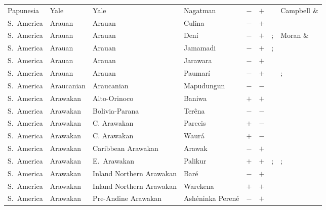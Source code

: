 \begin{landscape}
\begin{longtable}{l>{\raggedright\arraybackslash}p{2.2cm}>{\raggedright}p{2.5cm}>{\raggedright\arraybackslash}p{2.5cm}cc>{\raggedright\arraybackslash}p{3.4cm}>{\raggedright\arraybackslash}p{3.4cm}}
Papunesia & Yale & Yale & Nagatman & $-$ & $+$ & \citealt[14]{Campbell1987} & Campbell \& \citealt[18--22, 44--49]{Campbell1987}\\
S.~America & Arauan & Arauan & Culina & $-$ & $+$ & \citealt{Gil2013} & \citealt[249--251]{Derbyshire1990}\\
S.~America & Arauan & Arauan & Dení & $-$ & $+$ & \citealt{Gil2013}; \citealt[249--252]{Derbyshire1990} & Moran \& \citealt[40--41]{Moran1977}\\
S.~America & Arauan & Arauan & Jamamadi & $-$ & $+$ & \citealt{Gil2013}; \citealt[249--250]{Derbyshire1990} & \citealt[1]{Campbell1985}\\
S.~America & Arauan & Arauan & Jarawara & $-$ & $+$ & \citealt[passim]{Aikhenvald2000} & \citealt[264--265]{Dixon1995}\\
S.~America & Arauan & Arauan & Paumarí & $-$ & $+$ & \citealt{Gil2013} & \citealt{Corbett2013}; \citealt[237]{Aikhenvald2010}\\
S.~America & Araucanian & Araucanian & Mapudungun & $-$ & $-$ & \citealt{Gil2013} & \citealt{Corbett2013}\\
S.~America & Arawakan & Alto-Orinoco & Baniwa & $+$ & $+$ & \citealt[479--487]{Aikhenvald2007} & \citealt[476--479]{Aikhenvald2007}\\
S.~America & Arawakan & Bolivia-Parana & Terêna & $-$ & $-$ & \citealt{Gil2013} & \citealt[252]{Derbyshire1990}\\
S.~America & Arawakan & C. Arawakan & Parecis & $+$ & $-$ & \citealt{Gil2013} & \citealt[4]{Brandao2014}\\
S.~America & Arawakan & C. Arawakan & Waurá & $+$ & $-$ & \citealt{Gil2013} & \citealt[377]{Payne1991}\\
S.~America & Arawakan & Caribbean Arawakan & Arawak & $-$ & $+$ & \citealt{Gil2013} & \citealt[23, 28--29]{Pet1987}\\
S.~America & Arawakan & E.~Arawakan & Palikur & $+$ & $+$ & \citealt{Gil2013}; \citealt[192--198]{Aikhenvald2000} & \citealt[262--263]{Derbyshire1990}; \citealt[192--198]{Aikhenvald2000}\\
S.~America & Arawakan & Inland Northern Arawakan & Baré & $-$ & $+$ & \citealt{Gil2013} & \citealt[850--852]{Aikhenvald2007}\\
S.~America & Arawakan & Inland Northern Arawakan & Warekena & $+$ & $+$ & \citealt{Gil2013} & \citealt[298--299]{Aikhenvald1998}\\
S.~America & Arawakan & Pre-Andine Arawakan & Ashéninka Perené & $-$ & $+$ & \citealt[184--185]{Mihas2010} & \citealt[121--122]{Mihas2010}\\

\end{longtable}
\end{landscape}
